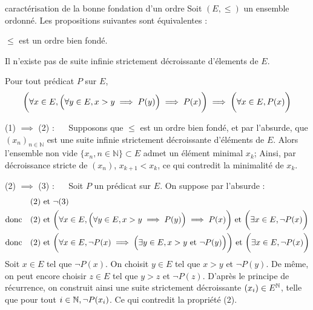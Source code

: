 


\begin{theoreme}{6.31}{caractérisation de la bonne fondation d'un ordre}
Soit $(E,\leq)$ un ensemble ordonné. Les propositions suivantes sont équivalentes : \begin{enumeratebf}
    \item $\leq$ est un ordre bien fondé.
    \item Il n'existe pas de suite infinie strictement décroissante d'élements de $E$.
    \item Pour tout prédicat $P$ sur $E$, $$\biggl(\forall x \in E, \Bigl(\forall y \in E, x>y \implies P(y)\Bigr) \implies P(x)\biggr) \implies \biggl(\forall x \in E, P(x)\biggr) $$
\end{enumeratebf}
\end{theoreme}


\begin{demonstration}
    (1) $\implies$ (2) : $\quad$ Supposons que $\leq$ est un ordre bien fondé, et par l'absurde, que $(x_n)_{n \in \mathbb{N}}$ est une suite infinie strictement décroissante d'éléments de $E$. Alors l'ensemble non vide $\{x_n, n\in \mathbb{N}\} \subset E$ admet un élément minimal $x_k$; Ainsi, par décroissance stricte de $(x_n)$, $x_{k+1} < x_k$, ce qui contredit la minimalité de $x_k$.
\end{demonstration}

\begin{demonstration}
    (2) $\implies$ (3) : $\quad$ Soit $P$ un prédicat sur $E$. On suppose par l'absurde : \begin{align*}
        &\text{(2) et } \lnot \text{(3)} \\
        \text{donc} \quad& \text{(2) et }  \biggl(\forall x \in E, \Bigl(\forall y \in E, x>y \implies P(y)\Bigr) \implies P(x)\biggr) \text{ et } \biggl(\exists x \in E, \lnot P(x)\biggr) \\
        \text{donc} \quad& \text{(2) et }  \biggl(\forall x \in E,   \lnot P(x) \implies \Bigl(\exists y \in E, x>y \text{ et } \lnot P(y)\Bigr) \biggr) \text{ et } \biggl(\exists x \in E, \lnot P(x)\biggr)  \\
    \end{align*}
    Soit $x \in E$ tel que $\lnot P(x)$. On choisit $y \in E$ tel que $x>y$ et $\lnot P(y)$. De même, on peut encore choisir $z \in E$ tel que $y>z$ et $\lnot P(z)$. D'après le principe de récurrence, on construit ainsi une suite strictement décroissante $(x_i) \in E^{\mathbb{N}}$, telle que pour tout $i \in \mathbb{N}, \lnot P(x_i)$. Ce qui contredit la propriété (2).
\end{demonstration}

